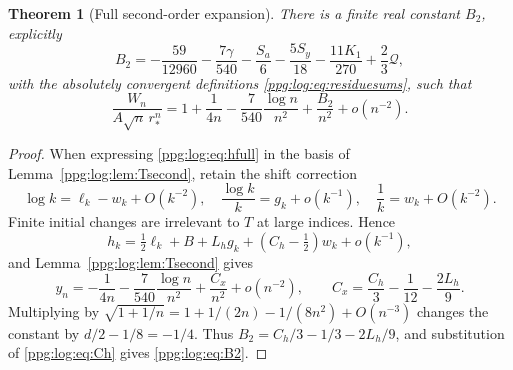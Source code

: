 \documentclass[11pt,letterpaper]{article}
\newtheorem{theorem}{Theorem}[section]
\theoremstyle{remark}\newtheorem{remark}[theorem]{Remark}
\numberwithin{equation}{section}
\begin{document}
\begin{theorem}[Full second-order expansion]\label{ppg:log:thm:full}
There is a finite real constant $B_2$, explicitly
\begin{equation}\label{ppg:log:eq:B2}
 B_2=-\frac{59}{12960}-\frac{7\gamma}{540}-\frac{S_a}6
               -\frac{5S_y}{18}-\frac{11K_1}{270}+\frac23\mathcal Q,
\end{equation}
with the absolutely convergent definitions \eqref{ppg:log:eq:residuesums}, such that
\begin{equation}\label{ppg:log:eq:full}
 \frac{W_n}{A\sqrt n\,r_*^n}
 =1+\frac1{4n}-\frac7{540}\frac{\log n}{n^2}
                       +\frac{B_2}{n^2}+o(n^{-2}).
\end{equation}
\end{theorem}
\begin{proof}
When expressing \eqref{ppg:log:eq:hfull} in the basis of Lemma~\ref{ppg:log:lem:Tsecond}, retain the shift correction
\[
 \log k=\ell_k-w_k+O(k^{-2}),\quad
 \frac{\log k}{k}=g_k+o(k^{-1}),\quad
 \frac1k=w_k+O(k^{-2}).
\]
Finite initial changes are irrelevant to $T$ at large indices. Hence
\[
 h_k=\tfrac12\ell_k+B+L_hg_k+(C_h-\tfrac12)w_k+o(k^{-1}),
\]
and Lemma~\ref{ppg:log:lem:Tsecond} gives
\[
 y_n=-\frac1{4n}-\frac7{540}\frac{\log n}{n^2}
        +\frac{C_x}{n^2}+o(n^{-2}),\qquad
 C_x=\frac{C_h}3-\frac1{12}-\frac{2L_h}9.
\]
Multiplying by $\sqrt{1+1/n}=1+1/(2n)-1/(8n^2)+O(n^{-3})$ changes the constant by $d/2-1/8=-1/4$. Thus
$B_2=C_h/3-1/3-2L_h/9$, and substitution of \eqref{ppg:log:eq:Ch} gives \eqref{ppg:log:eq:B2}.
\end{proof}
\end{document}
